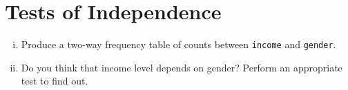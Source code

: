 \documentclass[12pt,a4paper]{article}\usepackage[]{graphicx}\usepackage[]{color}
\begin{document}
\section{Tests of Independence} 
\label{sec:ind}
\begin{enumerate}[(i)]
\item Produce a two-way frequency table of counts between \texttt{income} and \texttt{gender}.
\item Do you think that income level depends on gender? Perform an appropriate test to find out.
\end{enumerate}
\end{document}

